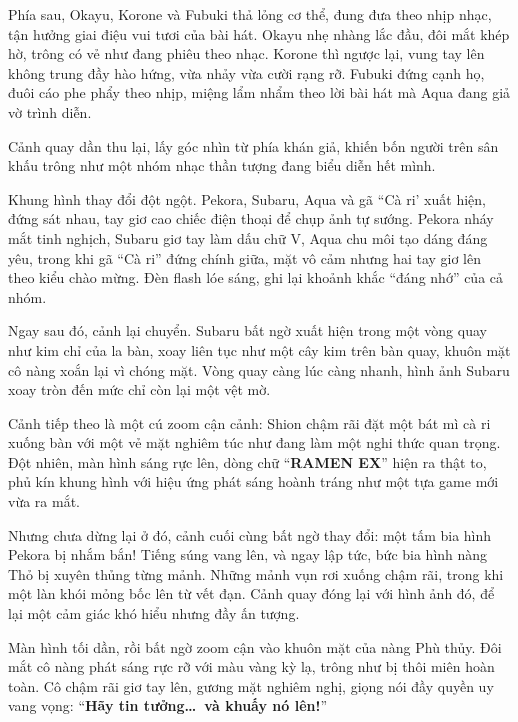 \documentclass[../main.tex]{subfiles}
\begin{document}
Phía sau, Okayu, Korone và Fubuki thả lỏng cơ thể, đung đưa theo nhịp nhạc, tận hưởng giai điệu vui tươi của bài hát. Okayu nhẹ nhàng lắc đầu, đôi mắt khép hờ, trông có vẻ như đang phiêu theo nhạc. Korone thì ngược lại, vung tay lên không trung đầy hào hứng, vừa nhảy vừa cười rạng rỡ. Fubuki đứng cạnh họ, đuôi cáo phe phẩy theo nhịp, miệng lẩm nhẩm theo lời bài hát mà Aqua đang giả vờ trình diễn.

Cảnh quay dần thu lại, lấy góc nhìn từ phía khán giả, khiến bốn người trên sân khấu trông như một nhóm nhạc thần tượng đang biểu diễn hết mình.

\ct


Khung hình thay đổi đột ngột. Pekora, Subaru, Aqua và gã ``Cà ri' xuất hiện, đứng sát nhau, tay giơ cao chiếc điện thoại để chụp ảnh tự sướng. Pekora nháy mắt tinh nghịch, Subaru giơ tay làm dấu chữ V, Aqua chu môi tạo dáng đáng yêu, trong khi gã ``Cà ri'' đứng chính giữa, mặt vô cảm nhưng hai tay giơ lên theo kiểu chào mừng. Đèn flash lóe sáng, ghi lại khoảnh khắc ``đáng nhớ'' của cả nhóm.

Ngay sau đó, cảnh lại chuyển. Subaru bất ngờ xuất hiện trong một vòng quay như kim chỉ của la bàn, xoay liên tục như một cây kim trên bàn quay, khuôn mặt cô nàng xoắn lại vì chóng mặt. Vòng quay càng lúc càng nhanh, hình ảnh Subaru xoay tròn đến mức chỉ còn lại một vệt mờ.

Cảnh tiếp theo là một cú zoom cận cảnh: Shion chậm rãi đặt một bát mì cà ri xuống bàn với một vẻ mặt nghiêm túc như đang làm một nghi thức quan trọng. Đột nhiên, màn hình sáng rực lên, dòng chữ ``\textbf{RAMEN EX}'' hiện ra thật to, phủ kín khung hình với hiệu ứng phát sáng hoành tráng như một tựa game mới vừa ra mắt.

Nhưng chưa dừng lại ở đó, cảnh cuối cùng bất ngờ thay đổi: một tấm bia hình Pekora bị nhắm bắn! Tiếng súng vang lên, và ngay lập tức, bức bia hình nàng Thỏ bị xuyên thủng từng mảnh. Những mảnh vụn rơi xuống chậm rãi, trong khi một làn khói mỏng bốc lên từ vết đạn. Cảnh quay đóng lại với hình ảnh đó, để lại một cảm giác khó hiểu nhưng đầy ấn tượng.

\ct


Màn hình tối dần, rồi bất ngờ zoom cận vào khuôn mặt của nàng Phù thủy. Đôi mắt cô nàng phát sáng rực rỡ với màu vàng kỳ lạ, trông như bị thôi miên hoàn toàn. Cô chậm rãi giơ tay lên, gương mặt nghiêm nghị, giọng nói đầy quyền uy vang vọng: ``\textbf{Hãy tin tưởng\dots\ và khuấy nó lên!}''
\end{document}
